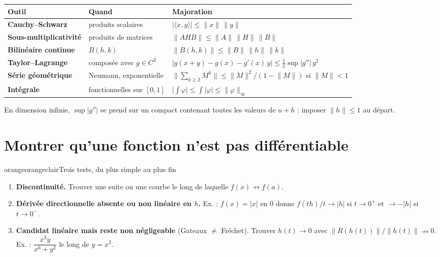 \documentclass[10pt,a4paper]{article}
\newcommand{\norm}[1]{\lVert #1\rVert}
\newcommand{\abs}[1]{\lvert #1\rvert}
\begin{document}
\begin{tcolorbox}[enhanced,colback=white,colframe=bleu!30,boxrule=0.5pt,arc=2pt,left=4pt,right=4pt,top=1pt,bottom=1pt]
\small
\begin{tabularx}{\linewidth}{@{}>{\sffamily\bfseries}l l X@{}}
\sffamily\bfseries Outil & \sffamily\bfseries Quand & \sffamily\bfseries Majoration\\
\midrule
Cauchy–Schwarz & produits scalaires & $\abs{\langle x,y\rangle}\le\norm{x}\,\norm{y}$\\
Sous-multiplicativité & produits de matrices & $\norm{AHB}\le\norm{A}\,\norm{H}\,\norm{B}$\\
Bilinéaire continue & $B(h,k)$ & $\norm{B(h,k)}\le\norm{B}\,\norm{h}\,\norm{k}$\\
Taylor–Lagrange & composée avec $g\in C^2$ & $\abs{g(x+y)-g(x)-g'(x)\,y}\le\tfrac12\sup\abs{g''}\,y^2$\\
Série géométrique & Neumann, exponentielle & $\bigl\lVert\sum_{k\ge2}M^k\bigr\rVert\le\norm{M}^2/(1-\norm{M})$ si $\norm{M}<1$\\
Intégrale & fonctionnelles sur $[0,1]$ & $\bigl|\int\varphi\bigr|\le\int\abs{\varphi}\le\norm{\varphi}_\infty$\\
\end{tabularx}
\end{tcolorbox}

{\small\color{gris}En dimension infinie, $\sup\abs{g''}$ se prend sur un compact contenant toutes les valeurs de $u+h$ : imposer $\norm{h}\le1$ au départ.}

\section{Montrer qu'une fonction n'est pas différentiable}

\begin{boite}{orange}{orangeclair}{Trois tests, du plus simple au plus fin}
\begin{enumerate}[label=\textbf{\sffamily\arabic*.},leftmargin=1.6em]
\item \textbf{Discontinuité.} Trouver une suite ou une courbe le long de laquelle $f(x)\nrightarrow f(a)$.
\item \textbf{Dérivée directionnelle absente ou non linéaire en $h$.}
Ex. : $f(x)=\abs{x}$ en $0$ donne $f(th)/t\to\abs{h}$ si $t\to0^+$ et $\to-\abs{h}$ si $t\to0^-$.
\item \textbf{Candidat linéaire mais reste non négligeable} (Gateaux $\neq$ Fréchet).
Trouver $h(t)\to0$ avec $\norm{R(h(t))}/\norm{h(t)}\nrightarrow0$.
Ex. : $\dfrac{x^3y}{x^6+y^2}$ le long de $y=x^3$.
\end{enumerate}
\end{boite}
\end{document}
